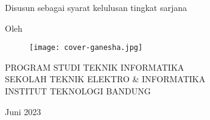 \clearpage
\pagestyle{empty}

\begin{center}
    \smallskip

    \Large \bfseries \MakeUppercase{\thetitle}
    \vfill

    \subtitle
    \vfill

    \large Disusun sebagai syarat kelulusan tingkat sarjana
    \vfill

    \large Oleh

    \Large \theauthor

    \vfill
    \begin{figure}[h]
        \centering
        \texttt{[image: cover-ganesha.jpg]}
    \end{figure}
    \vfill

    \large
    \uppercase{
        Program Studi Teknik Informatika \\
        Sekolah Teknik Elektro \& Informatika \\
        Institut Teknologi Bandung
    }

    Juni 2023

\end{center}

\clearpage
